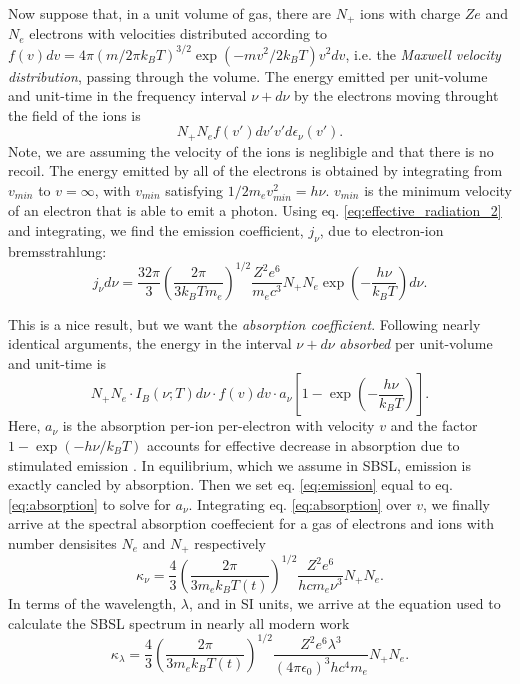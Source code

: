\documentclass[prb,aps,nofootinbib,superscriptaddress,floatfix]{revtex4-2}
\begin{document}
Now suppose that, in a unit volume of gas, there are $N_+$ ions with charge $Ze$ and $N_e$ electrons with velocities distributed according to $f(v)dv=4\pi(m/2\pi k_B T)^{3 / 2} \exp(-mv^2 / 2 k_B T) v^2 dv$, i.e. the \emph{Maxwell velocity distribution}, passing through the volume. The energy emitted per unit-volume and unit-time in the frequency interval $\nu+d\nu$ by the electrons moving throught the field of the ions is 
\begin{equation}
    N_+ N_e f(v') dv' v' d\epsilon_\nu(v').
    \label{eq:emission}
\end{equation}
Note, we are assuming the velocity of the ions is neglibigle and that there is no recoil. The energy emitted by all of the electrons is obtained by integrating from $v_{min}$ to $v=\infty$, with $v_{min}$ satisfying $1/2 m_e v^2_{min}=h\nu$. $v_{min}$ is the minimum velocity of an electron that is able to emit a photon. Using eq. \ref{eq:effective_radiation_2} and integrating, we find the emission coefficient, $j_\nu$, due to electron-ion bremsstrahlung:
\begin{equation}
    j_\nu d \nu=\frac{32\pi}{3}\left( \frac{2\pi}{3k_B T m_e} \right)^{1/2} \frac{Z^2 e^6}{m_e c^3} N_+ N_e \exp\left( -\frac{h\nu}{k_B T} \right)d\nu.
\end{equation}

This is a nice result, but we want the \emph{absorption coefficient}. Following nearly identical arguments, the energy in the interval $\nu+d\nu$ \emph{absorbed} per unit-volume and unit-time is
\begin{equation}
    N_+ N_e \cdot I_B(\nu;T) d\nu \cdot f(v) dv \cdot a_\nu \left[ 1-\exp\left( -\frac{h\nu}{k_B T} \right)\right].
    \label{eq:absorption}
\end{equation}
Here, $a_\nu$ is the absorption per-ion per-electron with velocity $v$ and the factor $1-\exp(-h\nu/k_B T)$ accounts for effective decrease in absorption due to stimulated emission \cite{zel2002physics}. In equilibrium, which we assume in SBSL, emission is exactly cancled by absorption. Then we set eq. \ref{eq:emission} equal to eq. \ref{eq:absorption} to solve for $a_\nu$. Integrating eq. \ref{eq:absorption} over $v$, we finally arrive at the spectral absorption coeffecient for a gas of electrons and ions with number densisites $N_e$ and $N_+$ respectively
\begin{equation}
    \kappa_\nu = \frac{4}{3} \left( \frac{2\pi}{3 m_e k_B T(t)} \right)^{1/2} \frac{Z^2 e^6}{h c m_e \nu^3} N_+ N_e .
\end{equation}
In terms of the wavelength, $\lambda$, and in SI units, we arrive at the equation used to calculate the SBSL spectrum in nearly all modern work \cite{hilgenfeldt1999simple,an2006mechanism,an2008spectral,an2009diagnosing}
\begin{equation}
    \kappa_\lambda = \frac{4}{3} \left( \frac{2\pi}{3 m_e k_B T(t)} \right)^{1/2} \frac{Z^2 e^6 \lambda^3}{ (4 \pi \epsilon_0)^3 h c^4 m_e } N_+ N_e .
    \label{eq:absorption_coeff}
\end{equation}
\end{document}
